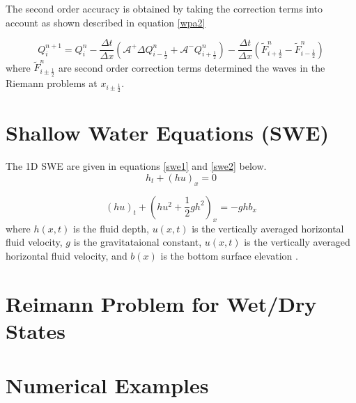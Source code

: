 \documentclass[12pt,a4paper]{article}
\begin{document}
	The second order accuracy is obtained by taking the correction terms into account as shown described in equation \eqref{wpa2}
	
	\begin{equation}
		Q_{i}^{n+1} =  Q_{i}^{n} - \frac{\Delta t}{\Delta x}(\mathcal{A^{+}}\Delta 	Q_{i-\frac{1}{2}}^{n} + \mathcal{A^{-}}Q_{i+\frac{1}{2}}^{n}) -  \frac{\Delta t}{\Delta x} (\tilde{F}_{i+\frac{1}{2}}^{n} - \tilde{F}_{i-\frac{1}{2}}^{n} )
		\label{wpa2}
	\end{equation}
	\noindent where $\tilde{F}_{i\pm\frac{1}{2}}^{n} $ are second order correction terms determined the waves in the Riemann problems at $x_{i\pm \frac{1}{2}}$.
	
	
	\section{Shallow Water Equations (SWE)}
	
The 1D SWE are given in equations \eqref{swe1} and \eqref{swe2} below.
 	\begin{equation}	
		h_{t} + (hu)_{x} = 0
		\label{swe1}
	\end{equation}

\begin{equation}
	(hu)_{t} + \left(hu^{2} + \frac{1}{2}gh^{2} \right)_{x} = -ghb_{x}
	\label{swe2}
\end{equation}
where $h(x,t)$ is the fluid depth, $u(x,t)$ is the vertically averaged horizontal fluid velocity, $g$ is the gravitataional constant, $u(x,t)$ is the vertically averaged horizontal fluid velocity, and $b(x)$ is the bottom surface elevation \cite{ge:2008}.
	\section{Reimann Problem for Wet/Dry States}
	
		\section{Numerical Examples}

	
	
	
\end{document}
